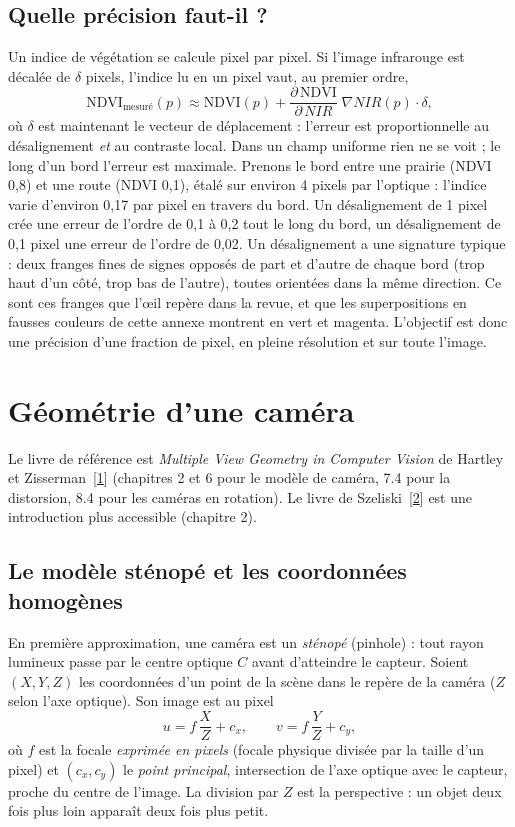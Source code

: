 \documentclass[a4paper,11pt]{report}
\begin{document}
\subsection{Quelle précision faut-il ?}\label{sec:ann_accuracy}
Un indice de végétation se calcule pixel par pixel. Si l'image infrarouge est décalée de $\delta$ pixels, l'indice lu en un pixel vaut, au premier ordre,
\begin{equation}
	\text{NDVI}_{\text{mesuré}}(p) \approx \text{NDVI}(p) + \frac{\partial\, \text{NDVI}}{\partial\, NIR}\; \nabla NIR(p) \cdot \delta,
\end{equation}
où $\delta$ est maintenant le vecteur de déplacement : l'erreur est proportionnelle au désalignement \emph{et} au contraste local. Dans un champ uniforme rien ne se voit ; le long d'un bord l'erreur est maximale. Prenons le bord entre une prairie (NDVI 0,8) et une route (NDVI 0,1), étalé sur environ 4 pixels par l'optique : l'indice varie d'environ 0,17 par pixel en travers du bord. Un désalignement de 1 pixel crée une erreur de l'ordre de 0,1 à 0,2 tout le long du bord, un désalignement de 0,1 pixel une erreur de l'ordre de 0,02. Un désalignement a une signature typique : deux franges fines de signes opposés de part et d'autre de chaque bord (trop haut d'un côté, trop bas de l'autre), toutes orientées dans la même direction. Ce sont ces franges que l'œil repère dans la revue, et que les superpositions en fausses couleurs de cette annexe montrent en vert et magenta. L'objectif est donc une précision d'une fraction de pixel, en pleine résolution et sur toute l'image.

\section{Géométrie d'une caméra}\label{sec:ann_camera}
Le livre de référence est \emph{Multiple View Geometry in Computer Vision} de Hartley et Zisserman~[\hyperref[ann_hz]{1}] (chapitres 2 et 6 pour le modèle de caméra, 7.4 pour la distorsion, 8.4 pour les caméras en rotation). Le livre de Szeliski~[\hyperref[ann_szeliski]{2}] est une introduction plus accessible (chapitre 2).

\subsection{Le modèle sténopé et les coordonnées homogènes}
En première approximation, une caméra est un \emph{sténopé} (pinhole) : tout rayon lumineux passe par le centre optique $C$ avant d'atteindre le capteur. Soient $(X,Y,Z)$ les coordonnées d'un point de la scène dans le repère de la caméra ($Z$ selon l'axe optique). Son image est au pixel
\begin{equation}
	u = f\,\frac{X}{Z} + c_x, \qquad v = f\,\frac{Y}{Z} + c_y,
\end{equation}
où $f$ est la focale \emph{exprimée en pixels} (focale physique divisée par la taille d'un pixel) et $(c_x, c_y)$ le \emph{point principal}, intersection de l'axe optique avec le capteur, proche du centre de l'image. La division par $Z$ est la perspective : un objet deux fois plus loin apparaît deux fois plus petit.
\end{document}
